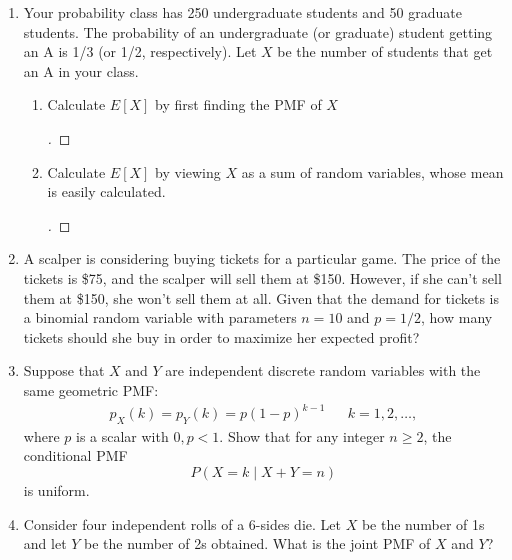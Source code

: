\documentclass[paper=usletter, fontsize=12pt]{article}
\begin{document}
\begin{enumerate}[label=\textbf{\arabic*}.]
        \item
        Your probability class has 250 undergraduate students and 50 graduate
        students. The probability of an undergraduate (or graduate) student
        getting an A is 1/3 (or 1/2, respectively). Let $X$ be the number of
        students that get an A in your class.
        \begin{enumerate}[label=(\alph*)]

            \item Calculate $E[X]$ by first finding the PMF of $X$
            \begin{proof}[\unskip\nopunct]
            \end{proof}
            \vspace{0.2in}

            \item Calculate $E[X]$ by viewing $X$ as a sum of random variables,
            whose mean is easily calculated.
            \begin{proof}[\unskip\nopunct]
            \end{proof}
            \vspace{0.2in}

        \end{enumerate}

        \item
        A scalper is considering buying tickets for a particular game. The
        price of the tickets is \$75, and the scalper will sell them at \$150.
        However, if she can't sell them at \$150, she won't sell them at all.
        Given that the demand for tickets is a binomial random variable with
        parameters $n=10$ and $p=1/2$, how many tickets should she buy in order
        to maximize her expected profit?

        \item
        Suppose that $X$ and $Y$ are independent discrete random variables with
        the same geometric PMF:
        \begin{align*}
            p_X(k)=p_Y(k)=p(1-p)^{k-1}&& k=1,2,\ldots,
        \end{align*}
        where $p$ is a scalar with $0,p<1$. Show that for any integer $n \ge
        2$, the conditional PMF
        \begin{equation*}
            P(X=k \mid X+Y=n)
        \end{equation*}
        is uniform.

        \item
        Consider four independent rolls of a 6-sides die. Let $X$ be the number
        of 1s and let $Y$ be the number of 2s obtained. What is the joint PMF
        of $X$ and $Y$?


\end{enumerate}
\end{document}
